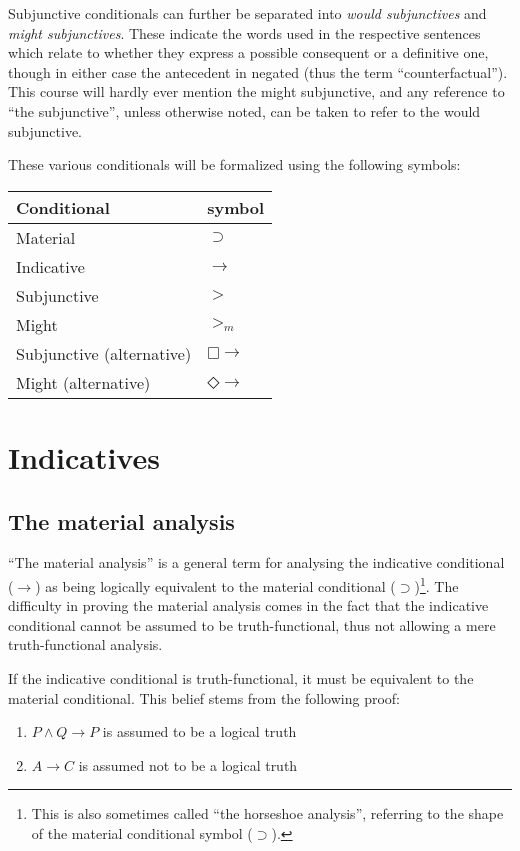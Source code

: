 \documentclass[12pt]{report}
\newcommand{\would}{\mathbin{\Box}{\rightarrow}}
\newcommand{\might}{\mathbin{\Diamond}{\rightarrow}}
\begin{document}
Subjunctive conditionals can further be separated into \emph{would subjunctives}
and \emph{might subjunctives}. These indicate the words used in the respective
sentences which relate to whether they express a possible consequent or a
definitive one, though in either case the antecedent in negated (thus the term
``counterfactual''). This course will hardly ever mention the might subjunctive,
and any reference to ``the subjunctive'', unless otherwise noted, can be taken
to refer to the would subjunctive.

These various conditionals will be formalized using the following symbols:
\begin{tabular}{l|l}
	Conditional & symbol\\
	\hline
	Material & $\supset$\\
	Indicative & $\rightarrow$\\
	Subjunctive & $>$\\
	Might & $>_m$\\
	Subjunctive (alternative) & $\would$\\
	Might (alternative) & $\might$\\
\end{tabular}

\part{Indicatives}
\chapter{The material analysis}

``The material analysis'' is a general term for analysing the indicative
conditional ($\rightarrow$) as being logically equivalent to the material
conditional ($\supset$)\footnote{This is also sometimes called ``the horseshoe
analysis'', referring to the shape of the material conditional symbol
($\supset$).}. The difficulty in proving the material analysis comes in the fact
that the indicative conditional cannot be assumed to be truth-functional, thus
not allowing a mere truth-functional analysis.

If the indicative conditional is truth-functional, it must be equivalent to the
material conditional. This belief stems from the following proof:
\begin{enumerate}
	\item
		$P \land Q \rightarrow P$ is assumed to be a logical truth 
	\item
		$A \rightarrow C$ is assumed not to be a logical truth
\end{enumerate}
\end{document}
